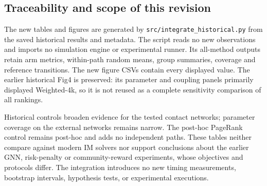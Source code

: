 \subsection{Traceability and scope of this revision}
The new tables and figures are generated by \texttt{src/integrate\_historical.py}
from the saved historical results and metadata. The script reads no new
observations and imports no simulation engine or experimental runner. Its
all-method outputs retain arm metrics, within-path random means, group
summaries, coverage and reference transitions. The new figure CSVs contain every
displayed value. The earlier historical Fig4 is preserved: its parameter and
coupling panels primarily displayed Weighted-4k, so it is not reused as a
complete sensitivity comparison of all rankings.

Historical controls broaden evidence for the tested contact networks; parameter
coverage on the external networks remains narrow. The post-hoc PageRank control
remains post-hoc and adds no independent paths. These tables neither compare
against modern IM solvers nor support conclusions about the earlier GNN,
risk-penalty or community-reward experiments, whose objectives and protocols
differ. The integration introduces no new timing measurements, bootstrap
intervals, hypothesis tests, or experimental executions.
